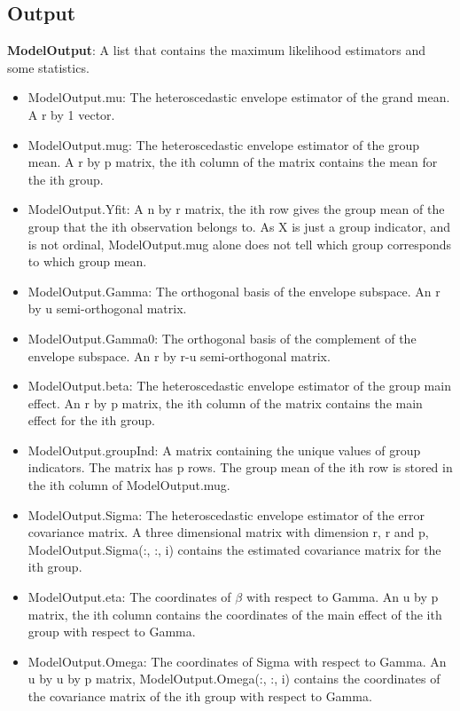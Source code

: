 \documentclass[a4paper,11pt,openany]{memoir}
\begin{document}
\subsection*{Output}

\begin{par}
\textbf{ModelOutput}: A list that contains the maximum likelihood estimators and some statistics.
\end{par} \vspace{1em}
\begin{itemize}
\setlength{\itemsep}{-1ex}
   \item ModelOutput.mu: The heteroscedastic envelope estimator of the grand mean. A r by 1 vector.
   \item ModelOutput.mug: The heteroscedastic envelope estimator of the group mean. A r by p matrix, the ith column of the matrix contains the mean for the ith group.
   \item ModelOutput.Yfit: A n by r matrix, the ith row gives the group mean of the group that the ith observation belongs to.  As X is just a group indicator, and is not ordinal, ModelOutput.mug alone does not tell which group corresponds to which group mean.
   \item ModelOutput.Gamma: The orthogonal basis of the envelope subspace. An r by u semi-orthogonal matrix.
   \item ModelOutput.Gamma0: The orthogonal basis of the complement of the envelope subspace.  An r by r-u semi-orthogonal matrix.
   \item ModelOutput.beta: The heteroscedastic envelope estimator of the group main effect. An r by p matrix, the ith column of the matrix contains the main effect for the ith group.
   \item ModelOutput.groupInd: A matrix containing the unique values of group indicators. The matrix has p rows.  The group mean of the ith row is stored in the ith column of ModelOutput.mug.
   \item ModelOutput.Sigma: The heteroscedastic envelope estimator of the error covariance matrix.  A three dimensional matrix with dimension r, r and p, ModelOutput.Sigma(:, :, i) contains the estimated covariance matrix for the ith group.
   \item ModelOutput.eta: The coordinates of $\beta$ with respect to Gamma. An u by p matrix, the ith column contains the coordinates of the main effect of the ith group with respect to Gamma.
   \item ModelOutput.Omega: The coordinates of Sigma with respect to Gamma. An u by u by p matrix, ModelOutput.Omega(:, :, i) contains the coordinates of the covariance matrix of the ith group with respect to Gamma.

\end{itemize}
\end{document}
